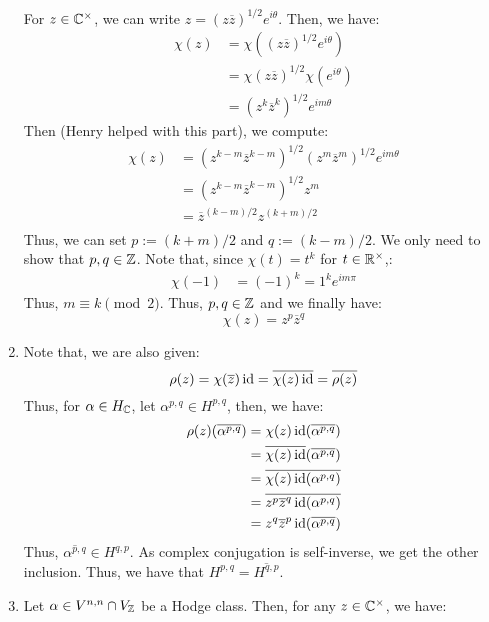 \documentclass[12pt]{article}
\begin{document}
\begin{solution}
\begin{enumerate}
        For $z \in \mathbb C^\times$, we can write $z = (z\overline z)^{1/2}e^{i\theta}$. Then, we have: 
        \begin{align*}
            \chi(z) &= \chi((z\overline z)^{1/2}e^{i\theta}) \\
            &= \chi(z\overline z)^{1/2}\chi(e^{i\theta}) \\
            &= (z^k\overline z^k)^{1/2}e^{im\theta}
        \end{align*}
        Then (Henry helped with this part), we compute:
        \begin{align*}
            \chi(z) &= (z^{k-m}\overline z^{k-m})^{1/2}(z^m\overline z^m)^{1/2}e^{im\theta} \\
            &= (z^{k-m}\overline z^{k-m})^{1/2}z^m \\
            &= \overline z^{(k-m)/2}z^{(k+m)/2} \\
        \end{align*}
        Thus, we can set $p:= (k+m)/2$ and $q := (k-m)/2$. We only need to show that $p, q \in \mathbb Z$. Note that, since $\chi(t) = t^k$ for $t \in \mathbb R^\times$,:
        \begin{align*}
            \chi(-1) &= (-1)^k = 1^ke^{im\pi}
        \end{align*}
        Thus, $m \equiv k \pmod 2$. Thus, $p, q \in \mathbb Z$ and we finally have:
        \[ \chi(z) = z^p\overline z^q\]
        \item Note that, we are also given:
        \[ \rho(z) = \chi(\overline z)\operatorname{id} = \overline{\chi(z)\operatorname{id}} = \overline{\rho(z)} \]
        Thus, for $\alpha \in H_\mathbb C$, let $\alpha^{p,q} \in H^{p,q}$, then, we have:
        \begin{align*}
            \rho(z)(\overline{\alpha^{p,q}}) &= \chi( z)\operatorname{id}(\overline{\alpha^{p, q}})\\
            &= \overline{\chi(z)\operatorname{id}}(\overline{\alpha^{p, q}}) \\
            &= \overline{\chi(z)\operatorname{id}(\alpha^{p,q})} \\
            &= \overline{z^p \overline z^q \operatorname{id}(\alpha^{p, q})} \\
            &= z^q \overline z^p \operatorname{id}(\overline{\alpha^{p,q}})
        \end{align*}
        Thus, $\overline{\alpha^{p,q}} \in H^{q,p}$. As complex conjugation is self-inverse, we get the other inclusion. Thus, we have that $H^{p,q} = \overline{H^{q,p}}$.
        \item Let $\alpha \in V^{n, n} \cap V_\mathbb Z$ be a Hodge class. Then, for any $z \in \mathbb C^\times$, we have:

\end{enumerate}
\end{solution}
\end{document}
